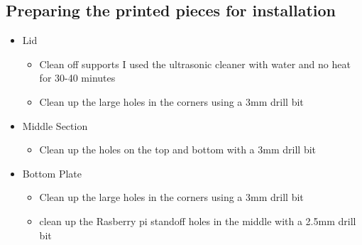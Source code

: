 \subsection{Preparing the printed pieces for installation}
\begin{itemize}
    \item Lid
        \begin{itemize}
            \item Clean off supports I used the ultrasonic cleaner with water and no heat for 30-40 minutes
            \item Clean up the large holes in the corners using a 3mm drill bit
        \end{itemize}
    \item Middle Section
        \begin{itemize}
            \item Clean up the holes on the top and bottom with a 3mm drill bit 
        \end{itemize}
    \item Bottom Plate
        \begin{itemize}
            \item Clean up the large holes in the corners using a 3mm drill bit
            \item clean up the Rasberry pi standoff holes in the middle with a 2.5mm drill bit
        \end{itemize}
\end{itemize}